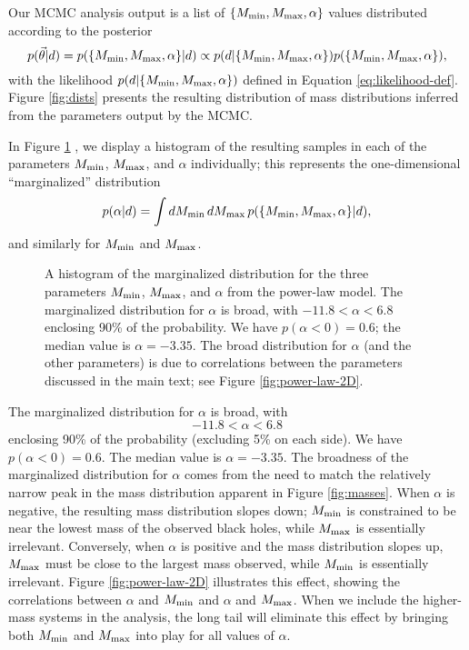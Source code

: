 \documentclass[preprint]{aastex}
\newcommand{\Mmin}{M_{\textnormal{min}}}
\newcommand{\Mmax}{M_{\textnormal{max}}}
\newcommand{\vtheta}{\vec{\theta}}
\begin{document}
Our MCMC analysis output is a list of $\{\Mmin, \Mmax, \alpha\}$
values distributed according to the posterior 
\begin{equation}
  p(\vtheta|d) = p(\{\Mmin, \Mmax, \alpha\}|d) \propto p(d|\{\Mmin,
  \Mmax, \alpha\}) p(\{\Mmin, \Mmax, \alpha\}),
\end{equation}
with the likelihood $p(d|\{\Mmin, \Mmax, \alpha\})$ defined in
Equation \eqref{eq:likelihood-def}.  Figure \ref{fig:dists} presents
the resulting distribution of mass distributions inferred from the
parameters output by the MCMC.

In Figure \ref{fig:power-law} , we display a histogram of the resulting
samples in each of the parameters $\Mmin$, $\Mmax$, and $\alpha$
individually; this represents the one-dimensional ``marginalized''
distribution
\begin{equation}
  \label{eq:alpha-pdf}
  p(\alpha|d) = \int d\Mmin\, d\Mmax\, p(\{\Mmin, \Mmax, \alpha\}|d),
\end{equation}
and similarly for $\Mmin$ and $\Mmax$.

\begin{figure}
  \begin{center}
  \end{center}
  \caption{\label{fig:power-law} A histogram of the marginalized
    distribution for the three parameters $\Mmin$, $\Mmax$, and
    $\alpha$ from the power-law model.  The marginalized distribution
    for $\alpha$ is broad, with $-11.8 < \alpha < 6.8$ enclosing 90\%
    of the probability.  We have $p(\alpha < 0) = 0.6$; the median
    value is $\alpha = -3.35$.  The broad distribution for $\alpha$
    (and the other parameters) is due to correlations between the
    parameters discussed in the main text; see Figure
    \ref{fig:power-law-2D}.}
\end{figure}

The marginalized distribution for $\alpha$ is broad, with
\begin{equation}
  -11.8 < \alpha < 6.8
\end{equation}
enclosing 90\% of the probability (excluding 5\% on each side).  We
have $p(\alpha < 0) = 0.6$.  The median value is $\alpha = -3.35$.
The broadness of the marginalized distribution for $\alpha$ comes from
the need to match the relatively narrow peak in the mass distribution
apparent in Figure \ref{fig:masses}.  When $\alpha$ is negative, the
resulting mass distribution slopes down; $\Mmin$ is constrained to be
near the lowest mass of the observed black holes, while $\Mmax$ is
essentially irrelevant.  Conversely, when $\alpha$ is positive and the
mass distribution slopes up, $\Mmax$ must be close to the largest mass
observed, while $\Mmin$ is essentially irrelevant.  Figure
\ref{fig:power-law-2D} illustrates this effect, showing the
correlations between $\alpha$ and $\Mmin$ and $\alpha$ and $\Mmax$.
When we include the higher-mass systems in the analysis, the long tail
will eliminate this effect by bringing both $\Mmin$ and $\Mmax$ into
play for all values of $\alpha$.
\end{document}

